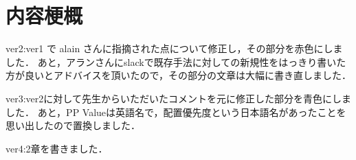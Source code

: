 \chapter*{内容梗概}
ver2:ver1 で alain さんに指摘された点について修正し，その部分を赤色にしました．
あと，アランさんにslackで既存手法に対しての新規性をはっきり書いた方が良いとアドバイスを頂いたので，その部分の文章は大幅に書き直しました．

ver3:ver2に対して先生からいただいたコメントを元に修正した部分を青色にしました．
あと，PP Valueは英語名で，配置優先度という日本語名があったことを思い出したので置換しました．

ver4:2章を書きました．


